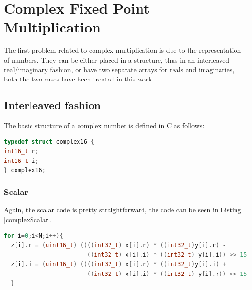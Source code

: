 \documentclass[a4paper]{article}
\begin{document}
\section{Complex Fixed Point Multiplication} \label{complex}
The first problem related to complex multiplication is due to the representation of numbers. They can be either placed in a structure, thus in an interleaved real/imaginary fashion, or have two separate arrays for reals and imaginaries, both the two cases have been treated in this work.

\subsection{Interleaved fashion}
The basic structure of a complex number is defined in C as follows:
\begin{lstlisting}[language=c,frame=tb,caption=Complex Number Structure,label=complex16]
typedef struct complex16 { 
int16_t r;                   
int16_t i;                   
} complex16;    
\end{lstlisting}

\subsubsection{Scalar}

Again, the scalar code is pretty straightforward, the code can be seen in Listing \ref{complexScalar}.
\begin{lstlisting}[language=c,frame=tb,caption=Scalar Complex Fixed Point Multiplication - Interleaved Fashion,label=complexScalar]
for(i=0;i<N;i++){    
  z[i].r = (uint16_t) ((((int32_t) x[i].r) * ((int32_t)y[i].r) -
                        ((int32_t) x[i].i) * ((int32_t) y[i].i)) >> 15);
  z[i].i = (uint16_t) ((((int32_t) x[i].r) * ((int32_t)y[i].i) +
                        ((int32_t) x[i].i) * ((int32_t) y[i].r)) >> 15);
  }
\end{lstlisting}
\end{document}
